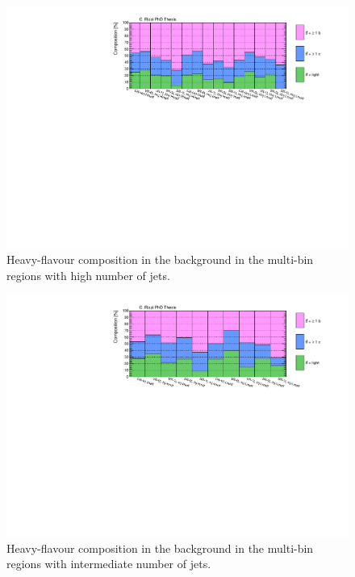 \begin{figure}[htbp]
\includegraphics[width=\textwidth]{figures/strong_prod/comp_plots/Hnj_HF.pdf}
\caption{Heavy-flavour composition in the \ttbar background in the multi-bin regions with high number of jets.}
	\label{fig:HFcomp_Hnj}
\end{figure}

\begin{figure}[htbp]
\includegraphics[width=\textwidth]{figures/strong_prod/comp_plots/Inj_HF.pdf}
\caption{Heavy-flavour composition in the \ttbar background in the multi-bin regions with intermediate number of jets.}
	\label{fig:HFcomp_Inj}
\end{figure}

